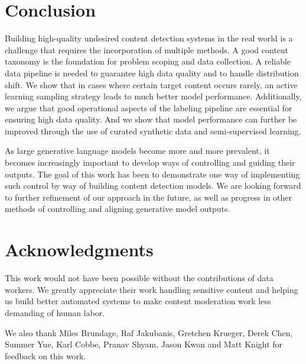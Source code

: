 \documentclass[letterpaper]{article} %
\begin{document}
\section{Conclusion}

Building high-quality undesired content detection systems in the real world is a challenge that requires the incorporation of multiple methods. A good content taxonomy is the foundation for problem scoping and data collection. A reliable data pipeline is needed to guarantee high data quality and to handle distribution shift. We show that in cases where certain target content occurs rarely, an active learning sampling strategy leads to much better model performance. Additionally, we argue that good operational aspects of the labeling pipeline are essential for ensuring high data quality. And we show that model performance can further be improved through the use of curated synthetic data and semi-supervised learning.

As large generative language models become more and more prevalent, it becomes increasingly important to develop ways of controlling and guiding their outputs. The goal of this work has been to demonstrate one way of implementing such control by way of building content detection models. We are looking forward to further refinement of our approach in the future, as well as progress in other methods of controlling and aligning generative model outputs.


\section{Acknowledgments}

This work would not have been possible without the contributions of data workers. We greatly appreciate their work handling sensitive content and helping us build better automated systems to make content moderation work less demanding of human labor.

We also thank Miles Brundage, Raf Jakubanis, Gretchen Krueger, Derek Chen, Summer Yue, Karl Cobbe, Pranav Shyam, Jason Kwon and Matt Knight for feedback on this work.


% 

\appendix


\end{document}
